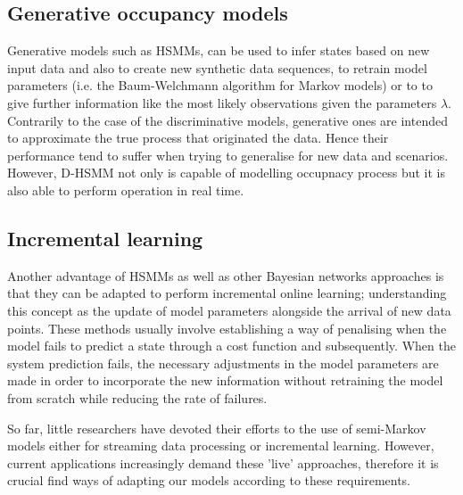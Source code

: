 \documentclass[conference]{IEEEtran}
\begin{document}
 
\subsection{Generative occupancy models}

% 

Generative models such as HSMMs, can be used to infer states based on new input data and also to create new synthetic data sequences, to retrain model parameters (i.e. the Baum-Welchmann algorithm for Markov models) or to to give further information like the most likely observations given the parameters $\lambda$. Contrarily to the case of the discriminative models, generative ones are intended to approximate the true process that originated the data. Hence their performance tend to suffer when trying to generalise for new data and scenarios. However, D-HSMM not only is capable of modelling occupnacy process but it is also able to perform operation in real time. 
 
 
 
  
 \subsection{Incremental learning}
 Another advantage of HSMMs as well as other Bayesian networks approaches is that they can be adapted to perform incremental online learning; understanding this concept as the update of model parameters alongside the arrival of new data points. These methods usually involve establishing a way of penalising when the model fails to predict a state through a cost function and subsequently. When the system prediction fails, the necessary adjustments in the model parameters are made in order to incorporate the new information without retraining the model from scratch while reducing the rate of failures. 
 
 So far, little researchers have devoted their efforts to the use of semi-Markov models either for streaming data processing or incremental learning. However, current applications increasingly demand these 'live' approaches, therefore it is crucial find ways of adapting our models according to these requirements.
  
\end{document}
